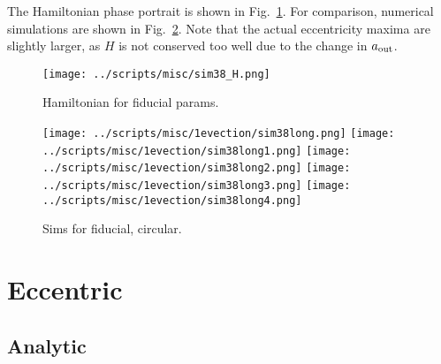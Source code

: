\documentclass[11pt,
        usenames, %
        dvipsnames %
    ]{article}
\begin{document}
The Hamiltonian phase portrait is shown in Fig.~\ref{fig:H}. For comparison,
numerical simulations are shown in Fig.~\ref{fig:sim}. Note that the actual
eccentricity maxima are slightly larger, as $H$ is not conserved too well due to
the change in $a_{\rm out}$.
\begin{figure}[h]
    \centering
    \texttt{[image: ../scripts/misc/sim38\_H.png]}
    \caption{Hamiltonian for fiducial params.}\label{fig:H}
\end{figure}
\begin{figure}[h]
    \centering
    \texttt{[image: ../scripts/misc/1evection/sim38long.png]}
    \texttt{[image: ../scripts/misc/1evection/sim38long1.png]}
    \texttt{[image: ../scripts/misc/1evection/sim38long2.png]}
    \texttt{[image: ../scripts/misc/1evection/sim38long3.png]}
    \texttt{[image: ../scripts/misc/1evection/sim38long4.png]}
    \caption{Sims for fiducial, circular.}\label{fig:sim}
\end{figure}

\section{Eccentric}

\subsection{Analytic}
\end{document}

